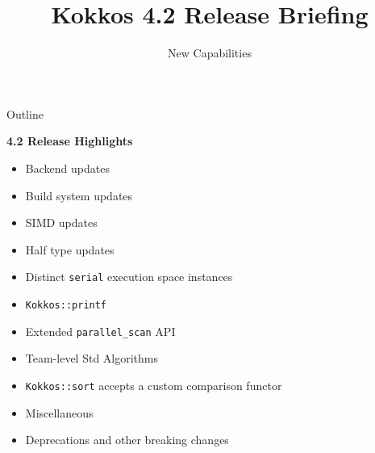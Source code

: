 
\usepackage{tikz}
\graphicspath{{4_0/figures/}}

\title{Kokkos 4.2 Release Briefing}

\author{New Capabilities}




\shorttrue
\mediumfalse
\fullfalse



\begin{frame}
        \titlepage
\end{frame}


\begin{frame}[fragile]{Outline}

\textbf{4.2 Release Highlights}

    \begin{itemize}
      \item{Backend updates}
      \item{Build system updates}
      \item{SIMD updates}
      \item{Half type updates}
      \item{Distinct \texttt{serial} execution space instances}
      \item{\texttt{Kokkos::printf}}
      \item{Extended \texttt{parallel\_scan} API}
      \item{Team-level Std Algorithms}
      \item{\texttt{Kokkos::sort} accepts a custom comparison functor}
      \item{Miscellaneous}
      \item{Deprecations and other breaking changes}
    \end{itemize}

\end{frame}

